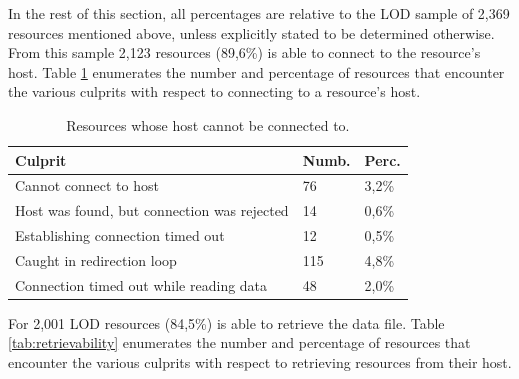 
In the rest of this section, all percentages are relative to
 the LOD sample of 2,369 resources mentioned above,
 unless explicitly stated to be determined otherwise.
From this sample 2,123 resources (89,6\%) \obs is able to connect to
 the resource's host.
Table \ref{tab:findability} enumerates the number and percentage
 of resources that encounter the various culprits
 with respect to connecting to a resource's host.

\begin{table}
  \centering
  \caption{Resources whose host cannot be connected to.}
  \label{tab:findability}
  \begin{tabular}{|l|l|l|}
    \hline
    \textbf{Culprit} & \textbf{Numb.} & \textbf{Perc.} \\
    \hline
    \hline
    Cannot connect to host & 76 & 3,2\% \\
    \hline
    Host was found, but connection was rejected & 14 & 0,6\% \\
    \hline
    Establishing connection timed out  & 12 & 0,5\% \\
    \hline
    Caught in redirection loop & 115 & 4,8\% \\
    \hline
    Connection timed out while reading data & 48 & 2,0\% \\
    \hline
  \end{tabular}
\end{table}

For 2,001 LOD resources (84,5\%) \obs is able to retrieve
 the data file.
Table \ref{tab:retrievability} enumerates the number and percentage
 of resources that encounter the various culprits
 with respect to retrieving resources from their host.

